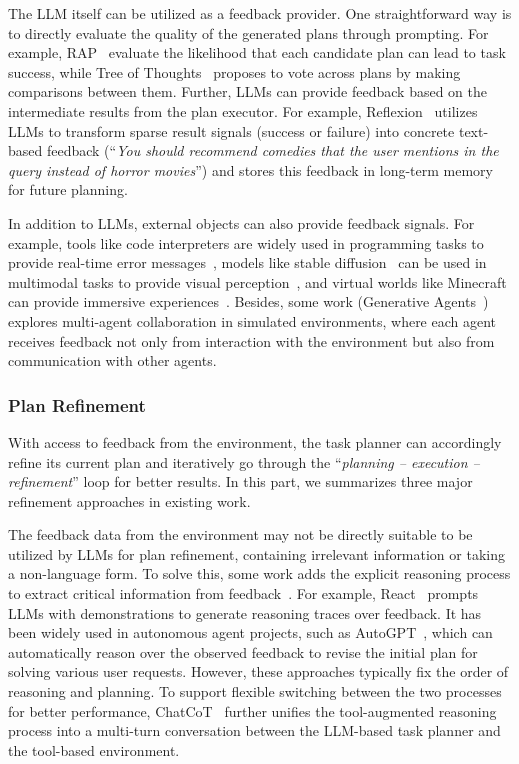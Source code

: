 The LLM itself can be utilized as a feedback provider.
One straightforward way is to directly evaluate the quality of the generated plans through prompting.
For example, RAP~\cite{Hao-2023-arXiv-reasoning} evaluate the likelihood that each candidate plan can lead to task success, while Tree of Thoughts~\cite{Yao-2023-arXiv-tree} proposes to vote across plans by making comparisons between them.
Further, LLMs can provide feedback based on the intermediate results from the plan executor.
For example, Reflexion~\cite{Shinn-2023-arXiv-Reflexion} utilizes LLMs to transform sparse result signals (\eg success or failure) into concrete {text-based feedback (\eg ``\emph{You should recommend comedies that the user mentions in the query instead of horror movies}'') and stores this feedback in long-term memory for future planning.}


In addition to LLMs, external objects can also provide feedback signals.
For example, tools like code interpreters are widely used in programming tasks to provide real-time error messages~\cite{Shinn-2023-arXiv-Reflexion}, models like stable diffusion~\cite{Rombach-2022-CVPR-high} can be used in multimodal tasks to provide visual perception~\cite{Lu-2023-arXiv-multimodal}, and {virtual worlds} like Minecraft can provide immersive experiences~\cite{Wang-2023-arXiv-voyager}.
Besides, some work (\eg Generative Agents~\cite{Park-arxiv-2023-Generative}) explores multi-agent collaboration in simulated environments, where each agent receives feedback not only from interaction with the environment but also from communication with other agents.

\subsubsection{Plan Refinement}
\label{sec:plan-refine}
With access to feedback from the environment, the task planner can accordingly refine its current plan and iteratively go through the ``\emph{planning -- execution -- refinement}'' loop for better results.
In this part, we summarizes three major refinement approaches in existing work. 

The feedback data from the environment may not be directly suitable to be utilized by LLMs for plan refinement, \eg containing irrelevant information or taking a non-language form.
To solve this, some work adds the explicit reasoning process to extract critical information from feedback~\cite{Yao-2022-arXiv-react, Chen-2023-arXiv-chatcot}.
For example, React~\cite{Yao-2022-arXiv-react} prompts LLMs with demonstrations to generate reasoning traces over feedback.
It has been widely used in autonomous agent projects, such as AutoGPT~\cite{AutoGPT}, which can automatically reason over the observed feedback to revise the initial plan for solving various user requests.
However, these approaches typically fix the order of reasoning and planning.
To support flexible switching between the two processes for better performance, ChatCoT~\cite{Chen-2023-arXiv-chatcot} further unifies the tool-augmented reasoning process into a multi-turn conversation between the LLM-based task planner and the tool-based environment.

